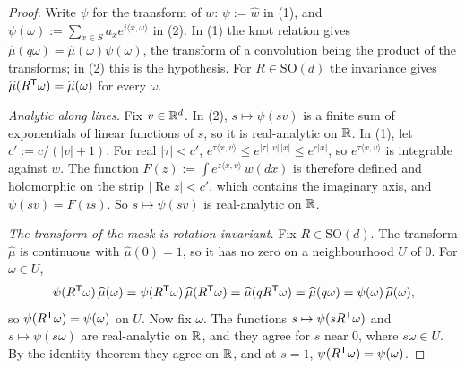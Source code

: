 \begin{proof}
Write $\psi$ for the transform of $w$: $\psi := \widehat{w}$ in (1), and
$\psi(\omega) := \sum_{x \in S}a_xe^{i\langle x, \omega\rangle}$ in (2). In (1) the knot relation
gives $\widehat\mu(q\omega) = \widehat\mu(\omega)\psi(\omega)$, the transform of a convolution being
the product of the transforms; in (2) this is the hypothesis. For $R \in \mathrm{SO}(d)$ the
invariance gives $\widehat\mu(R^{\mathsf{T}}\omega) = \widehat\mu(\omega)$ for every $\omega$.

\emph{Analytic along lines.} Fix $v \in \mathbb{R}^d$. In (2), $s \mapsto \psi(sv)$ is a finite sum of
exponentials of linear functions of $s$, so it is real-analytic on $\mathbb{R}$. In (1), let
$c' := c/(|v| + 1)$. For real $|\tau| < c'$, $e^{\tau\langle x, v\rangle} \le
e^{|\tau|\,|v|\,|x|} \le e^{c|x|}$, so $e^{\tau\langle x, v\rangle}$ is integrable against $w$. The
function $F(z) := \int e^{z\langle x, v\rangle}\,w(dx)$ is therefore defined and holomorphic on the
strip $|\operatorname{Re}z| < c'$, which contains the imaginary axis, and $\psi(sv) = F(is)$. So
$s \mapsto \psi(sv)$ is real-analytic on $\mathbb{R}$.

\emph{The transform of the mask is rotation invariant.} Fix $R \in \mathrm{SO}(d)$. The transform
$\widehat\mu$ is continuous with $\widehat\mu(0) = 1$, so it has no zero on a neighbourhood $U$ of
$0$. For $\omega \in U$,
\[
\psi(R^{\mathsf{T}}\omega)\,\widehat\mu(\omega) = \psi(R^{\mathsf{T}}\omega)\,\widehat\mu(R^{\mathsf{T}}\omega)
= \widehat\mu(qR^{\mathsf{T}}\omega) = \widehat\mu(q\omega) = \psi(\omega)\,\widehat\mu(\omega),
\]
so $\psi(R^{\mathsf{T}}\omega) = \psi(\omega)$ on $U$. Now fix $\omega$. The functions
$s \mapsto \psi(sR^{\mathsf{T}}\omega)$ and $s \mapsto \psi(s\omega)$ are real-analytic on $\mathbb{R}$, and they
agree for $s$ near $0$, where $s\omega \in U$. By the identity theorem they agree on $\mathbb{R}$, and at
$s = 1$, $\psi(R^{\mathsf{T}}\omega) = \psi(\omega)$.


\end{proof}
